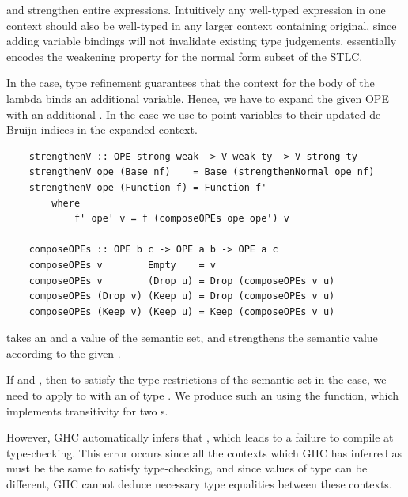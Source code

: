  and  strengthen entire expressions. Intuitively any well-typed expression in one context should also be well-typed in any larger context containing original, since adding variable bindings will not invalidate existing type judgements.  essentially encodes the weakening property for the normal form subset of the STLC. 

In the  case, type refinement guarantees that the context for the body of the lambda binds an additional variable. Hence, we have to expand the given OPE with an additional . In the  case we use  to point variables to their updated de Bruijn indices in the expanded context.

\begin{lstlisting}
    strengthenV :: OPE strong weak -> V weak ty -> V strong ty
    strengthenV ope (Base nf)    = Base (strengthenNormal ope nf)
    strengthenV ope (Function f) = Function f' 
        where
            f' ope' v = f (composeOPEs ope ope') v

    composeOPEs :: OPE b c -> OPE a b -> OPE a c
    composeOPEs v        Empty    = v
    composeOPEs v        (Drop u) = Drop (composeOPEs v u)
    composeOPEs (Drop v) (Keep u) = Drop (composeOPEs v u)
    composeOPEs (Keep v) (Keep u) = Keep (composeOPEs v u)
\end{lstlisting}

 takes an  and a value of the semantic set, and strengthens the semantic value according to the given .

If  and , then to satisfy the type restrictions of the semantic set in the  case, we need to apply  to  with an  of type . We produce such an  using the  function, which implements transitivity for two s.


However, GHC automatically infers that , which leads to a failure to compile at type-checking. This error occurs since all the contexts which GHC has inferred as  must be the same to satisfy type-checking, and since values of type  can be different, GHC cannot deduce necessary type equalities between these contexts. 

